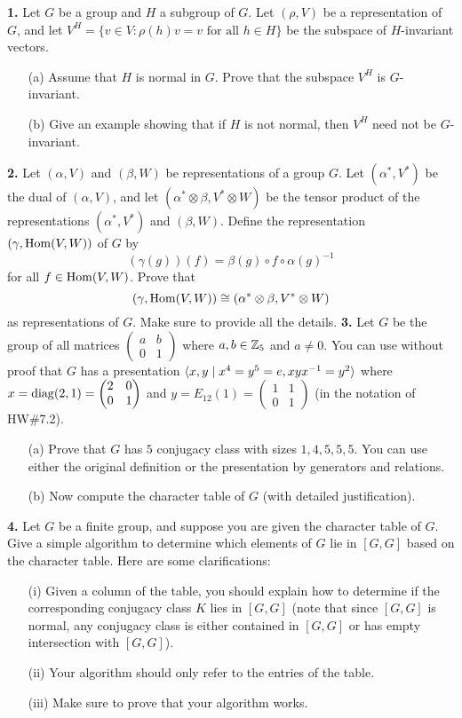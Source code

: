\documentclass[12pt]{amsart}
\begin{document}
\skv
{\bf 1.} Let $G$ be a group and $H$ a subgroup of $G$. Let $(\rho,V)$ be a representation of $G$, and let
$V^H=\{v\in V: \rho(h)v=v \mbox{ for all }h\in H\}$ be the subspace of $H$-invariant vectors.
\begin{itemize}
\item[(a)] Assume that $H$ is normal in $G$. Prove that the subspace $V^H$ is $G$-invariant.
\item[(b)] Give an example showing that if $H$ is not normal, then $V^H$ need not be $G$-invariant.
\end{itemize}
\newpage

{\bf 2.} Let $(\alpha,V)$ and $(\beta,W)$ be representations of a group $G$. Let $(\alpha^*,V^*)$ be the dual
of $(\alpha,V)$, and let $(\alpha^*\otimes\beta, V^*\otimes W)$ be the tensor product of the representations $(\alpha^*,V^*)$ 
and $(\beta,W)$. Define the representation $(\gamma,{\rm Hom}(V,W))$
of $G$ by $$(\gamma(g))(f)=\beta(g)\circ f\circ \alpha(g)^{-1}$$ for all $f\in {\rm Hom}(V,W)$. Prove that 
$$(\gamma,{\rm Hom}(V,W))\cong (\alpha^*\otimes\beta, V^*\otimes W)$$ as representations of $G$. Make sure to provide all the details.
\skv
{\bf 3.} Let $G$ be the group of all matrices $\begin{pmatrix}a&b \\ 0& 1 \end{pmatrix}$ where $a,b\in{\mathbb Z}_5$ and $a\neq 0$.
You can use without proof that $G$ has a presentation ${\langle} x,y \mid x^4=y^5=e, xyx^{-1}=y^2{\rangle}$ where 
$x={\rm diag}(2,1)=\begin{pmatrix}2&0 \\ 0& 1 \end{pmatrix}$ and $y=E_{12}(1)=\begin{pmatrix}1&1 \\ 0& 1 \end{pmatrix}$   
(in the notation of HW\#7.2).
\begin{itemize}
\item[(a)] Prove that $G$ has $5$ conjugacy class with sizes $1,4,5,5,5$. You can use either the original definition or the presentation by
generators and relations.
\item[(b)] Now compute the character table of $G$ (with detailed justification).
\end{itemize}
\skv
{\bf 4.} Let $G$ be a finite group, and suppose you are given the character table of $G$. Give a simple algorithm to determine which elements of $G$ lie in $[G,G]$ based on the character table. Here are some clarifications:
\begin{itemize}
\item[(i)] Given a column of the table, you should explain how to determine if the corresponding conjugacy class $K$ lies in $[G,G]$ (note that
since $[G,G]$ is normal, any conjugacy class is either contained in $[G,G]$ or has empty intersection with $[G,G]$).
\item[(ii)] Your algorithm should only refer to the entries of the table. 
\item[(iii)] Make sure to prove that your algorithm works.
\end{itemize}
\end{document}
